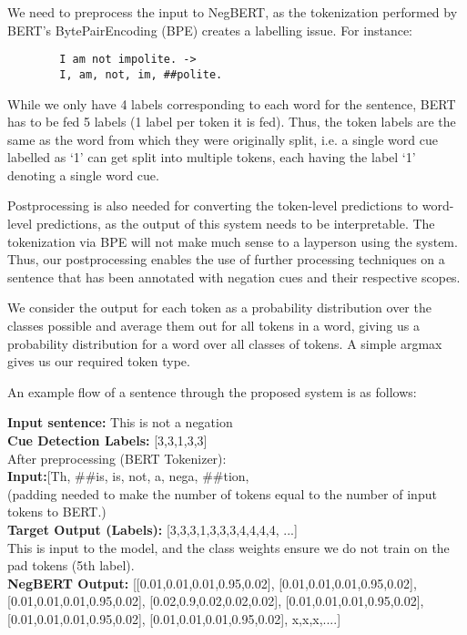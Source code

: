 \documentclass[10pt, a4paper]{article}
\begin{document}
We need to preprocess the input to NegBERT, as the tokenization performed by BERT’s BytePairEncoding (BPE) creates a labelling issue. For instance:
\begin{center}
    \begin{verbatim}
        I am not impolite. ->
        I, am, not, im, ##polite.
    \end{verbatim}
\end{center}
\par While we only have 4 labels corresponding to each word for the sentence, BERT has to be fed 5 labels (1 label per token it is fed). Thus, the token labels are the same as the word from which they were originally split, i.e. a single word cue labelled as ‘1’ can get split into multiple tokens, each having the label ‘1’ denoting a single word cue.
\par Postprocessing is also needed for converting the token-level predictions to word-level predictions, as the output of this system needs to be interpretable. The tokenization via BPE will not make much sense to a layperson using the system. Thus, our postprocessing enables the use of further processing techniques on a sentence that has been annotated with negation cues and their respective scopes.
\par We consider the output for each token as a probability distribution over the classes possible and average them out for all tokens in a word, giving us a probability distribution for a word over all classes of tokens. A simple argmax gives us our required token type.
\par An example flow of a sentence through the proposed system is as follows:
\begin{center}
    \textbf{Input sentence:}  This is not a negation\\
    \textbf{Cue Detection Labels:} [3,3,1,3,3] \\
    After preprocessing (BERT Tokenizer): \\
    \textbf{Input:}[Th, \#\#is, is, not, a, nega, \#\#tion,  \\ (padding needed to make the number of tokens equal to the number of input tokens to BERT.)\\
    \textbf{Target Output (Labels):} [3,3,3,1,3,3,3,4,4,4,4, ...]\\
    This is input to the model, and the class weights ensure we do not train on the pad tokens (5th label). \\
    \textbf{NegBERT Output: }[[0.01,0.01,0.01,0.95,0.02], [0.01,0.01,0.01,0.95,0.02], [0.01,0.01,0.01,0.95,0.02], [0.02,0.9,0.02,0.02,0.02], [0.01,0.01,0.01,0.95,0.02], [0.01,0.01,0.01,0.95,0.02], [0.01,0.01,0.01,0.95,0.02], x,x,x,....]
\end{center}
\end{document}
